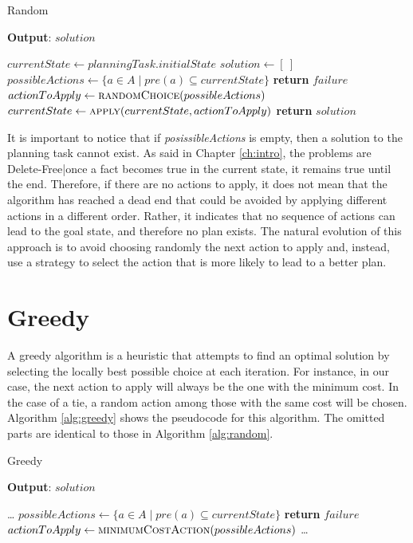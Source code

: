 \begin{algorithm}
	\caption{Random}
	\label{alg:random}
	\hspace*{0.5em} \textbf{Output}: $solution$
	\begin{algorithmic}[1]
		\State $currentState \gets planningTask.initialState$
		\State $solution \gets [\ ]$ 
		\State $possibleActions \gets \{a \in A \mid pre(a) \subseteq currentState\}$
		\State \textbf{return} $failure$ 
		\EndIf
		\State $actionToApply \gets \Call{randomChoice}{possibleActions}$
		\State $currentState \gets \Call{apply}{currentState, actionToApply}$
		\State {}
		\EndWhile
		\State \textbf{return} $solution$
		\EndProcedure
	\end{algorithmic}
\end{algorithm}

It is important to notice that if \textit{posissibleActions} is empty, then
a solution to the planning task cannot exist. As said in Chapter \ref{ch:intro},
the problems are Delete-Free|once a fact becomes true in the current state, it remains
true until the end.
Therefore, if there are no actions to apply, it does not mean that the algorithm has reached
a dead end that could be avoided by applying different actions in a different order.
Rather, it indicates that no sequence of actions can lead to the goal state, and therefore no plan exists.
The natural evolution of this approach is to avoid choosing randomly the next action to apply and, instead, use
a strategy to select the action that is more likely to lead to a better plan.

\section{Greedy}
A greedy algorithm is a heuristic that attempts to find an optimal solution by selecting the locally
best possible choice at each iteration. For instance, in our case, the next action to apply will
always be the one with the minimum cost. In the case of a tie, a random action among those with the same cost
will be chosen.
Algorithm \ref{alg:greedy} shows the pseudocode for this algorithm. The omitted parts are identical to those in Algorithm \ref{alg:random}.

\begin{algorithm}
	\caption{Greedy}
	\label{alg:greedy}
	\hspace*{0.5em} \textbf{Output}: $solution$
	\begin{algorithmic}[1]
		\State \dots
		\State $possibleActions \gets \{a \in A \mid pre(a) \subseteq currentState\}$
		\State \textbf{return} $failure$
		\EndIf
		\State $actionToApply \gets \Call{minimumCostAction}{possibleActions}$
		\State \dots
		\EndProcedure
	\end{algorithmic}
\end{algorithm}

